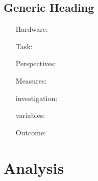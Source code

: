 \subsection{Generic Heading}
\begin{itemize}
	\item[Hardware:] 
	\item[Task:] 
	\item[Perspectives:] 
	\item[Measures:] 
	\item[investigation:] 
	\item[variables:] 
	\item[Outcome:] 
\end{itemize}

\section{Analysis}
